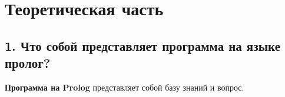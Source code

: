 \documentclass[12pt]{report}
\begin{document}

\chapter*{Теоретическая часть}

\section*{1. Что собой представляет программа на языке пролог?}


\textbf{Программа на Prolog} представляет собой базу знаний и вопрос. 
\end{document}
